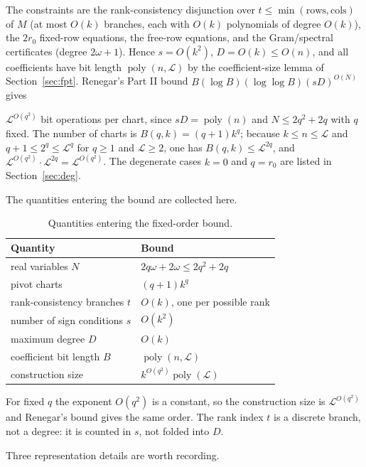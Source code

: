 \documentclass[journal]{IEEEtran}
\theoremstyle{plainn}
\theoremstyle{remark}
\begin{document}
The constraints are the rank-consistency disjunction over $t\le\min(\text{rows},\text{cols})$ of $M$ (at most $O(k)$ branches, each with $O(k)$ polynomials of degree $O(k)$), the $2r_0$ fixed-row equations, the free-row equations, and the Gram/spectral certificates (degree $2\omega+1$). Hence $s=O(k^2)$, $D=O(k)\le O(n)$, and all coefficients have bit length $\operatorname{poly}(n,\mathcal L)$ by the coefficient-size lemma of Section~\ref{sec:fpt}. Renegar's Part II bound $B(\log B)(\log\log B)(sD)^{O(N)}$ gives

$\mathcal L^{O(q^2)}$ bit operations per chart, since $sD=\operatorname{poly}(n)$ and $N\le2q^2+2q$
with $q$ fixed. The number of charts is $B(q,k)=(q+1)k^{q}$; because $k\le n\le\mathcal L$ and
$q+1\le2^{q}\le\mathcal L^{q}$ for $q\ge1$ and $\mathcal L\ge2$, one has $B(q,k)\le\mathcal L^{2q}$,
and $\mathcal L^{O(q^2)}\cdot\mathcal L^{2q}=\mathcal L^{O(q^2)}$. The degenerate cases $k=0$ and
$q=r_0$ are listed in Section~\ref{sec:deg}.

The quantities entering the bound are collected here.

\begin{table}[!t]
\centering
\caption{Quantities entering the fixed-order bound.}\label{tab:4}
\small
\begin{tabular}{p{}p{}}
\toprule
Quantity & Bound \\
\midrule
real variables $N$ & $2q\omega+2\omega\le2q^2+2q$ \\
pivot charts & $(q+1)k^q$ \\
rank-consistency branches $t$ & $O(k)$, one per possible rank \\
number of sign conditions $s$ & $O(k^2)$ \\
maximum degree $D$ & $O(k)$ \\
coefficient bit length $B$ & $\operatorname{poly}(n,\mathcal L)$ \\
construction size & $k^{O(q^2)}\operatorname{poly}(\mathcal L)$ \\
\bottomrule
\end{tabular}
\end{table}
For fixed $q$ the exponent $O(q^2)$ is a constant, so the construction size is $\mathcal L^{O(q^2)}$ and Renegar's bound gives the same order. The rank index $t$ is a discrete branch, not a degree: it is counted in $s$, not folded into $D$.

Three representation details are worth recording.
\end{document}
